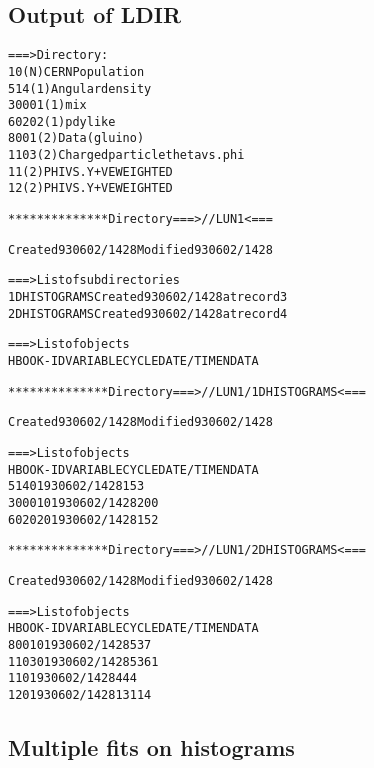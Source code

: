 \subsection*{Output of LDIR}
\begin{alltt}
 ===> Directory :
         10 (N)   CERN Population
        514 (1)   Angular density
      30001 (1)   mix
      60202 (1)   p dy like
       8001 (2)   Data (gluino)
       1103 (2)   Charged particle theta vs. phi
         11 (2)   PHI VS. Y  +VE    WEIGHTED
         12 (2)   PHI VS. Y  +VE    WEIGHTED

 ************** Directory ===> //LUN1 <===

                  Created 930602/1428  Modified 930602/1428


 ===> List of subdirectories
 1DHISTOGRAMS     Created 930602/1428 at record     3
 2DHISTOGRAMS     Created 930602/1428 at record     4

 ===> List of objects
     HBOOK-ID  VARIABLE                             CYCLE    DATE/TIME   NDATA

 ************** Directory ===> //LUN1/1DHISTOGRAMS <===

                  Created 930602/1428  Modified 930602/1428


 ===> List of objects
     HBOOK-ID  VARIABLE                             CYCLE    DATE/TIME   NDATA
        514         0                                   1   930602/1428    153
      30001         0                                   1   930602/1428    200
      60202         0                                   1   930602/1428    152

 ************** Directory ===> //LUN1/2DHISTOGRAMS <===

                  Created 930602/1428  Modified 930602/1428


 ===> List of objects
     HBOOK-ID  VARIABLE                             CYCLE    DATE/TIME   NDATA
       8001         0                                   1   930602/1428    537
       1103         0                                   1   930602/1428   5361
         11         0                                   1   930602/1428    444
         12         0                                   1   930602/1428  13114
\end{alltt}

\clearpage

\subsection{Multiple fits on histograms}
